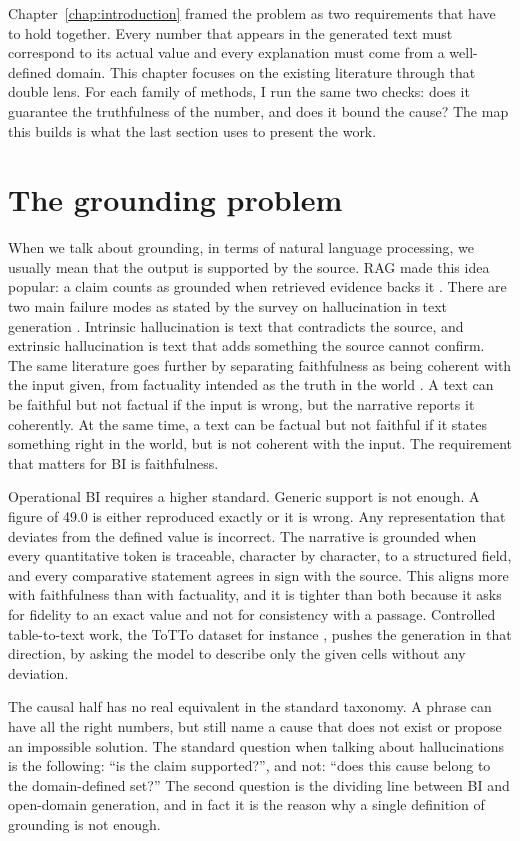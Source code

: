 \documentclass[12pt,a4paper,openright,twoside]{book}
\begin{document}
Chapter~\ref{chap:introduction} framed the problem as two requirements that have to hold together. 
Every number that appears in the generated text must correspond to its actual value and every explanation must come from a well-defined domain.
This chapter focuses on the existing literature through that double lens.
For each family of methods, I run the same two checks: does it guarantee the truthfulness of the number, and does it bound the cause?
The map this builds is what the last section uses to present the work.

\section{The grounding problem}
When we talk about grounding, in terms of natural language processing, we usually mean that the output is supported by the source.
\ac{RAG} made this idea popular: a claim counts as grounded when retrieved evidence backs it \cite{lewis2020rag}.
There are two main failure modes as stated by the survey on hallucination in text generation \cite{ji2023survey}.
Intrinsic hallucination is text that contradicts the source, and extrinsic hallucination is text that adds something the source cannot confirm.
The same literature goes further by separating faithfulness as being coherent with the input given, from factuality intended as the truth in the world \cite{huang2025hallucination}.
A text can be faithful but not factual if the input is wrong, but the narrative reports it coherently.
At the same time, a text can be factual but not faithful if it states something right in the world, but is not coherent with the input.
The requirement that matters for \ac{BI} is faithfulness. 

Operational \ac{BI} requires a higher standard. 
Generic support is not enough.
A figure of 49.0 is either reproduced exactly or it is wrong. Any representation that deviates from the defined value is incorrect. 
The narrative is grounded when every quantitative token is traceable, character by character, to a structured field, and every comparative statement agrees in sign with the source.
This aligns more with faithfulness than with factuality, and it is tighter than both because it asks for fidelity to an exact value and not for consistency with a passage. 
Controlled table-to-text work, the ToTTo dataset for instance \cite{parikh2020totto}, pushes the generation in that direction, by asking the model to describe only the given cells without any deviation.

The causal half has no real equivalent in the standard taxonomy. 
A phrase can have all the right numbers, but still name a cause that does not exist or propose an impossible solution.
The standard question when talking about hallucinations is the following: \enquote{is the claim supported?}, and not: \enquote{does this cause belong to the domain-defined set?}
The second question is the dividing line between \ac{BI} and open-domain generation, and in fact it is the reason why a single definition of grounding is not enough.
\end{document}
